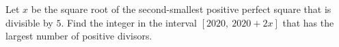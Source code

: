 Let $x$ be the square root of the second-smallest positive perfect square that is divisible by $5$. Find the integer in the interval $[2020,\ 2020+2x]$ that has the largest number of positive divisors.
